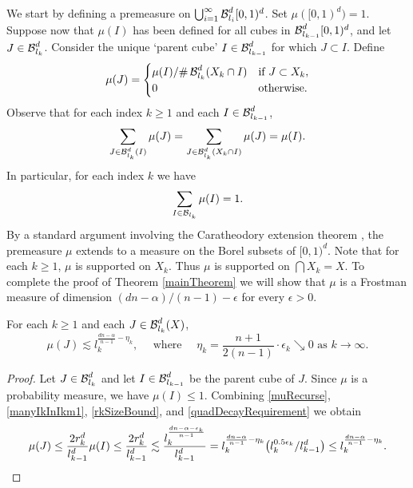 We start by defining a premeasure on $\bigcup_{i = 1}^\infty \operatorname{\mathcal{B}}^d_{l_i}[0,1)^d$. Set $\mu([0,1)^d) = 1$. Suppose now that $\mu(I)$ has been defined for all cubes in $\operatorname{\mathcal{B}}^d_{l_{k-1}}[0,1)^d$, and let $J \in \operatorname{\mathcal{B}}^d_{l_k}$. Consider the unique `parent cube' $I \in \operatorname{\mathcal{B}}^d_{l_{k-1}}$ for which $J \subset I$. Define
%
\begin{equation} \label{muRecurse} 
	\mu(J) = \begin{cases} {\mu(I)}/{\# \operatorname{\mathcal{B}}^d_{l_k}(X_k \cap I)} & \textrm{if}\ J \subset X_k,\\
0 & \textrm{otherwise}.
\end{cases}
\end{equation}
Observe that for each index $k\geq 1$ and each $I \in \operatorname{\mathcal{B}}_{l_{k-1}}^d$, 
%
\begin{equation}\label{muBreakDown}
	\sum_{J \in \operatorname{\mathcal{B}}_{l_k}^d(I)} \mu(J) = \sum_{J \in \operatorname{\mathcal{B}}_{l_k}^d(X_k\cap I)} \mu(J) = \mu(I).
\end{equation}
In particular, for each index $k$ we have
%
\[ \sum_{I\in\operatorname{\mathcal{B}}_{l_k}}\mu(I)=1. \]
%
By a standard argument involving the Caratheodory extension theorem \cite[Proposition 1.7]{Falconer}, the premeasure $\mu$ extends to a measure on the Borel subsets of $[0,1)^d$. Note that for each $k \geq 1$, $\mu$ is supported on $X_k$. Thus $\mu$ is supported on $\bigcap X_k = X$. To complete the proof of Theorem \ref{mainTheorem} we will show that $\mu$ is a Frostman measure of dimension $(dn - \alpha)/(n - 1)-\epsilon$ for every $\epsilon>0$. 



\begin{lemma}\label{massSomeScales}
	For each $k \geq 1$ and each $J \in \operatorname{\mathcal{B}}^d_{l_k}(X)$, 
	\[ \mu(J) \lesssim l_k^{\frac{dn-\alpha}{n-1}- \eta_k}, \quad \text{ where } \quad \eta_k = \frac{n+1}{2(n-1)} \cdot \epsilon_k \searrow 0 \text{ as } k \rightarrow \infty. \]
\end{lemma}
\begin{proof}
	Let $J \in \operatorname{\mathcal{B}}^d_{l_k}$ and let $I \in \operatorname{\mathcal{B}}^d_{l_{k-1}}$ be the parent cube of $J$. Since $\mu$ is a probability measure, we have $\mu(I) \leq 1$. Combining \eqref{muRecurse}, \eqref{manyIkInIkm1}, \eqref{rkSizeBound}, and \eqref{quadDecayRequirement} we obtain
	\[ \mu(J)\leq \frac{2r_k^d}{l_{k-1}^d}\mu(I)\leq \frac{2r_k^d}{l_{k-1}^d}\lesssim \frac{l_{k}^{\frac{dn-\alpha - \epsilon_k}{n-1}}}{l_{k-1}^d}=l_k^{\frac{dn-\alpha}{n-1}-\eta_k}\big(l_k^{0.5 \epsilon_k}/l_{k-1}^d\big)\leq l_k^{\frac{dn-\alpha}{n-1}-\eta_k}.\qedhere \]
\end{proof}

